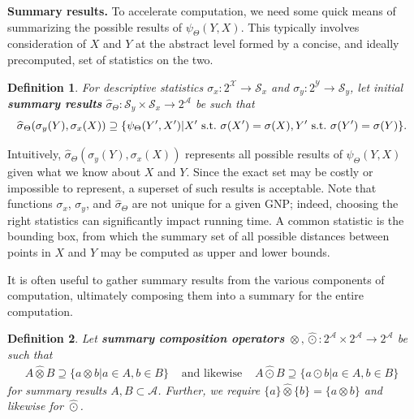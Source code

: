 \documentclass{article}
\newtheorem{definition} {Definition}
\newcommand{\killspace}{\vspace{-0.08in}}
\newcommand{\GNP}[1][\psi]{{#1}_{\Theta}}
\newcommand{\sigmahat}{\mathbin{\widehat{\sigma}}}
\newcommand{\otimeshat}{\mathbin{\widehat{\otimes}}}
\newcommand{\odothat}{\mathbin{\widehat{\odot}}}
\newcommand{\st}{{\rm~s.t.~}}
\begin{document}

{\bf Summary results.}
To accelerate computation, we need some quick means of summarizing the possible results of $\GNP(Y,X)$.
This typically involves consideration of $X$ and $Y$ at the abstract level formed by a concise, and ideally precomputed, set of statistics on the two.
\begin{definition}
  For descriptive statistics $\sigma_x \colon 2^{\mathcal{X}} \to
  \mathcal{S}_x$ and $\sigma_y \colon 2^{\mathcal{Y}} \to
  \mathcal{S}_y$, let initial {\bf summary results} $\GNP[\sigmahat]
  \colon \mathcal{S}_y \times \mathcal{S}_x \to 2^\mathcal{A}$ be such
  that
  \[
  \GNP[\sigmahat](\sigma_y(Y),\sigma_x(X)) \supseteq \{\GNP(Y',X') | X' \st \sigma(X') = \sigma(X), Y' \st \sigma(Y') = \sigma(Y)\}.
  \]
\end{definition}
\killspace
\noindent Intuitively, $\GNP[\sigmahat](\sigma_y(Y),\sigma_x(X))$ represents all possible results of $\GNP(Y,X)$ given what we know about $X$ and $Y$.
Since the exact set may be costly or impossible to represent, a superset of such results is acceptable.
Note that functions $\sigma_x$, $\sigma_y$, and $\GNP[\sigmahat]$ are not unique for a given GNP; indeed, choosing the right statistics can significantly impact running time.
A common statistic is the bounding box, from which the summary set of all possible distances between points in $X$ and $Y$ may be computed as upper and lower bounds.

It is often useful to gather summary results from the various components of computation, ultimately composing them into a summary for the entire computation.
\begin{definition}
  Let {\bf summary composition operators} $\otimeshat, \odothat \colon
  2^{\mathcal{A}} \times 2^{\mathcal{A}} \to 2^{\mathcal{A}}$ be such
  that
  \[ \begin{array}{rcl}
    A \otimeshat B \supseteq \{a \otimes b | a \in A, b \in B\} & \mbox{ and likewise } & A \odothat B \supseteq \{a \odot b | a \in A, b \in B\}
  \end{array} \]
  for summary results $A,B \subset \mathcal{A}$.  Further, we require
  $\{a\} \otimeshat \{b\} = \{a \otimes b\}$ and likewise for
  $\odothat$.
\end{definition}
\killspace
\end{document}
